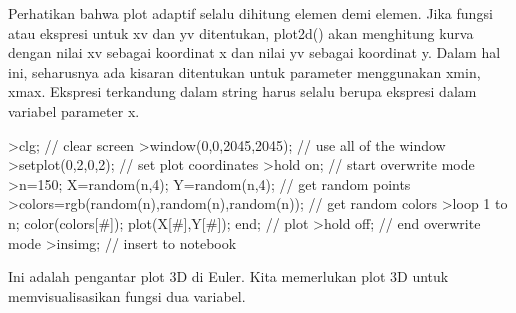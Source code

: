 \documentclass[a4paper,10pt]{article}
\begin{document}
\begin{eulernotebook}
\begin{eulercomment}
\begin{eulercomment}
\begin{eulercomment}
\begin{eulercomment}
\begin{eulercomment}
\begin{eulercomment}
\begin{eulercomment}
\begin{eulercomment}
\begin{eulercomment}
\begin{eulercomment}
\begin{eulercomment}
\begin{eulercomment}
\begin{eulercomment}
\begin{eulercomment}
\begin{eulercomment}
\begin{eulercomment}
\begin{eulercomment}
\begin{eulercomment}
\begin{eulercomment}
\begin{eulercomment}
\begin{eulercomment}
\begin{eulercomment}
\begin{eulercomment}
\begin{eulercomment}
\begin{eulercomment}
\begin{eulercomment}
\begin{eulercomment}
\begin{eulercomment}
\begin{eulercomment}
\begin{eulercomment}
\begin{eulercomment}
\begin{eulercomment}
\begin{eulercomment}
\begin{eulercomment}
\begin{eulercomment}
\begin{eulercomment}
\begin{eulercomment}
\begin{eulercomment}
\begin{eulercomment}
Perhatikan bahwa plot adaptif selalu dihitung elemen demi elemen. Jika
fungsi atau ekspresi untuk xv dan yv ditentukan, plot2d() akan
menghitung kurva dengan nilai xv sebagai koordinat x dan nilai yv
sebagai koordinat y. Dalam hal ini, seharusnya ada kisaran ditentukan
untuk parameter menggunakan xmin, xmax. Ekspresi terkandung dalam
string harus selalu berupa ekspresi dalam variabel parameter x.

\begin{eulercomment}
\begin{eulerprompt}
>clg; // clear screen
>window(0,0,2045,2045); // use all of the window 
>setplot(0,2,0,2); // set plot coordinates
>hold on; // start overwrite mode
>n=150; X=random(n,4); Y=random(n,4); // get random points
>colors=rgb(random(n),random(n),random(n)); // get random colors
>loop 1 to n; color(colors[#]); plot(X[#],Y[#]); end; // plot
>hold off; // end overwrite mode
>insimg; // insert to notebook
\end{eulerprompt}
\begin{eulercomment}
Ini adalah pengantar plot 3D di Euler. Kita memerlukan plot 3D untuk
memvisualisasikan fungsi dua variabel.


\end{eulercomment}
\end{eulercomment}
\end{eulercomment}
\end{eulercomment}
\end{eulercomment}
\end{eulercomment}
\end{eulercomment}
\end{eulercomment}
\end{eulercomment}
\end{eulercomment}
\end{eulercomment}
\end{eulercomment}
\end{eulercomment}
\end{eulercomment}
\end{eulercomment}
\end{eulercomment}
\end{eulercomment}
\end{eulercomment}
\end{eulercomment}
\end{eulercomment}
\end{eulercomment}
\end{eulercomment}
\end{eulercomment}
\end{eulercomment}
\end{eulercomment}
\end{eulercomment}
\end{eulercomment}
\end{eulercomment}
\end{eulercomment}
\end{eulercomment}
\end{eulercomment}
\end{eulercomment}
\end{eulercomment}
\end{eulercomment}
\end{eulercomment}
\end{eulercomment}
\end{eulercomment}
\end{eulercomment}
\end{eulercomment}
\end{eulercomment}
\end{eulercomment}
\end{eulernotebook}
\end{document}
